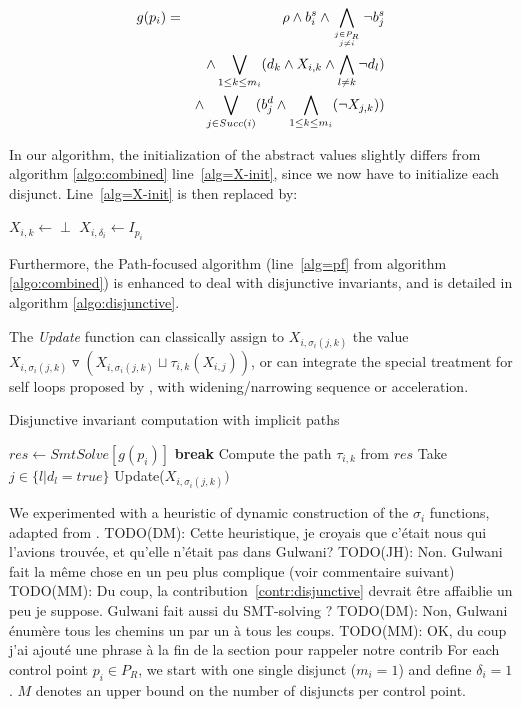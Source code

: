 \documentclass[preprint]{sigplanconf}
\newcommand{\MM}[1]{{\color{blue} TODO(MM): #1}}
\newcommand{\JH}[1]{{\color{teal} TODO(JH): #1}}
\newcommand{\DM}[1]{{\color{violet} TODO(DM): #1}}
\newcommand{\widening}{\mathop{\triangledown}}
\begin{document}
\begin{eqnarray*}
g(p_i) & = & \rho \wedge b_i^s \wedge 
\displaystyle\bigwedge_{j \in P_R \atop j \neq i} \neg b_j^s  \\
 & & \wedge 
\displaystyle\bigvee_{1 \leq k \leq m_i} (d_k \wedge X_{i,k} \wedge \bigwedge_{l \neq k}
\neg d_l) \\
 & & \wedge
\displaystyle\bigvee_{j \in Succ(i)} 
(b_j^d \wedge \bigwedge_{1 \leq k \leq m_i} (\neg X_{j,k}))
\end{eqnarray*}

In our algorithm, the initialization of the abstract values slightly differs from
algorithm \ref{algo:combined} line~\ref{alg=X-init}, since we now have to
initialize each disjunct. Line~\ref{alg=X-init} is then replaced by:
\begin{algorithm}[!h]
\begin{algorithmic}[1] 
	\STATE $X_{i,k} \gets \perp$
\ENDFOR
\STATE $X_{i,\delta_i} \gets I_{p_i}$
\end{algorithmic}
\end{algorithm}

Furthermore, the Path-focused algorithm (line~\ref{alg=pf} from algorithm
\ref{algo:combined}) is enhanced to deal with disjunctive invariants, and
is detailed in algorithm \ref{algo:disjunctive}.

The \emph{Update} function can classically assign to $X_{i,\sigma_i(j,k)}$ the
value $X_{i,\sigma_i(j,k)} \widening (X_{i,\sigma_i(j,k)} \sqcup
\tau_{i,k}(X_{i,j}))$, or can integrate the special treatment for self loops
proposed by \citet{Monniaux_Gonnord_SAS11}, with widening/narrowing sequence or
acceleration.

\begin{algorithm}[!h]
\caption{Disjunctive invariant computation with implicit paths}\label{gulwani2}
\label{algo:disjunctive}
\begin{algorithmic}[1] 
	\STATE $res \gets SmtSolve\left[g(p_i)\right]$
		\STATE \textbf{break}
	\ENDIF
	\STATE Compute the path $\tau_{i,k}$ from $res$ 
	\STATE Take $j \in \{ l | d_l = true\}$ 
	\STATE Update($X_{i,\sigma_i(j,k)})$
\ENDWHILE
\end{algorithmic}
\end{algorithm}

We experimented with a heuristic
of dynamic construction of the $\sigma_i$ functions, adapted from
\citet{DBLP:conf/pldi/GulwaniZ10}. 
\DM{Cette heuristique, je croyais que c'était nous qui l'avions trouvée,
et qu'elle n'était pas dans Gulwani?}
\JH{Non. Gulwani fait la même chose en un peu plus complique (voir commentaire
suivant)}
\MM{Du coup, la contribution~\ref{contr:disjunctive} devrait être
  affaiblie un peu je suppose. Gulwani fait aussi du SMT-solving ?}
\DM{Non, Gulwani énumère tous les chemins un par un à tous les coups.}
\MM{OK, du coup j'ai ajouté une phrase à la fin de la section pour
  rappeler notre contrib}
For each control point $p_i \in P_R$, we start with one single disjunct
($m_i = 1$) and define $\delta_i = 1$.
$M$ denotes an upper bound on the number of disjuncts per control point.
\end{document}
